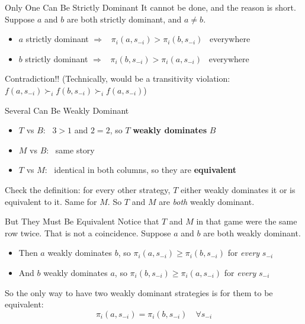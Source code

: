\begin{frame}{Only One Can Be Strictly Dominant}
It cannot be done, and the reason is short.
\bsk
Suppose $a$ and $b$ are both strictly dominant, and $a\ne b$.
\begin{itemize}
    \item $a$ strictly dominant $\Rightarrow$ \ $\pi_i(a,s_{-i})>\pi_i(b,s_{-i})$ \ everywhere
    \item $b$ strictly dominant $\Rightarrow$ \ $\pi_i(b,s_{-i})>\pi_i(a,s_{-i})$ \ everywhere
\end{itemize}
Contradiction!!
\bsk
\vfill
(Technically, would be a transitivity violation: $f(a,s_{-i})\succ_i f(b,s_{-i}) \succ_i f(a,s_{-i})$)
\vspace{0.7in}
\end{frame}

\begin{frame}{Several Can Be Weakly Dominant}
\centering
\begin{matrixgame}[top={L, R}, left={T, M, B}, player names={Player 1, Player 2}]
\end{matrixgame}
\bsk
\raggedright
\begin{itemize}
    \item $T$ vs $B$: \ $3>1$ and $2=2$, so $T$ \textbf{weakly dominates} $B$
    \item $M$ vs $B$: \ same story
    \item $T$ vs $M$: \ identical in both columns, so they are \textbf{equivalent}
\end{itemize}
\bsk
Check the definition: for every other strategy, $T$ either weakly dominates it or is
equivalent to it. Same for $M$.
\vfill
So $T$ and $M$ are \textit{both} weakly dominant. \vspace{0.4in}
\end{frame}

\begin{frame}{But They Must Be Equivalent}
Notice that $T$ and $M$ in that game were the same row twice. That is not a coincidence.
\bsk
Suppose $a$ and $b$ are both weakly dominant.
\begin{itemize}
    \item Then $a$ weakly dominates $b$, so $\pi_i(a,s_{-i})\geq \pi_i(b,s_{-i})$ for
      \textit{every} $s_{-i}$
    \item And $b$ weakly dominates $a$, so $\pi_i(b,s_{-i})\ge\pi_i(a,s_{-i})$ for
      \textit{every} $s_{-i}$
\end{itemize}
\bsk
So the only way to have two weakly dominant strategies is for them to be equivalent:\\
$$\pi_i(a,s_{-i})=\pi_i(b,s_{-i})\quad \forall s_{-i}$$
\vspace{-0.2in}
\end{frame}

